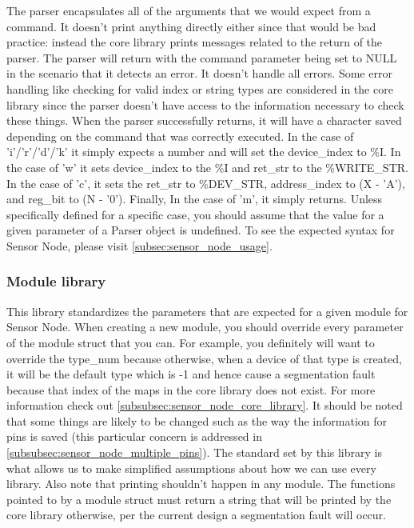 \documentclass{article}
\begin{document}
The parser encapsulates all of the arguments that we would expect from a command. It doesn't print anything directly either since that would be bad practice: instead the core library prints messages related to the return of the parser. The parser will return with the command parameter being set to NULL in the scenario that it detects an error. It doesn't handle all errors. Some error handling like checking for valid index or string types are considered in the core library since the parser doesn't have access to the information necessary to check these things. When the parser successfully returns, it will have a character saved depending on the command that was correctly executed. In the case of 'i'/'r'/'d'/'k' it simply expects a number and will set the device\_index to \%I. In the case of 'w' it sets device\_index to the \%I and ret\_str to the \%WRITE\_STR. In the case of 'c', it sets the ret\_str to \%DEV\_STR, address\_index to (X - 'A'), and reg\_bit to (N - '0'). Finally, In the case of 'm', it simply returns. Unless specifically defined for a specific case, you should assume that the value for a given parameter of a Parser object is undefined. To see the expected syntax for Sensor Node, please visit \autoref{subsec:sensor_node_usage}.

\subsubsection{Module library}

This library standardizes the parameters that are expected for a given module for Sensor Node. When creating a new module, you should override every parameter of the module struct that you can. For example, you definitely will want to override the type\_num because otherwise, when a device of that type is created, it will be the default type which is -1 and hence cause a segmentation fault because that index of the maps in the core library does not exist. For more information check out \autoref{subsubsec:sensor_node_core_library}. It should be noted that some things are likely to be changed such as the way the information for pins is saved (this particular concern is addressed in \autoref{subsubsec:sensor_node_multiple_pins}). The standard set by this library is what allows us to make simplified assumptions about how we can use every library. Also note that printing shouldn't happen in any module. The functions pointed to by a module struct must return a string that will be printed by the core library otherwise, per the current design a segmentation fault will occur.
\end{document}
